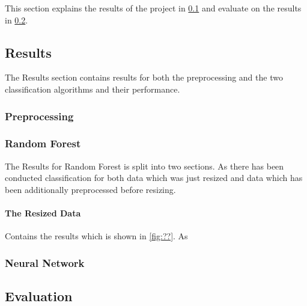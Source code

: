 This section explains the results of the project in \ref{subsec:results} and evaluate on the results in \ref{subsec:evaluation}.

\subsection{Results}
\label{subsec:results}
The Results section contains results for both the preprocessing and the two classification algorithms and their performance.

\subsubsection{Preprocessing}

\subsubsection{Random Forest}
The Results for Random Forest is split into two sections. As there has been conducted classification for both data which was just resized and data which has been additionally preprocessed before resizing.

\paragraph{The Resized Data} 
Contains the results which is shown in \ref{fig:??}. As 


\subsubsection{Neural Network}



\subsection{Evaluation}
\label{subsec:evaluation}